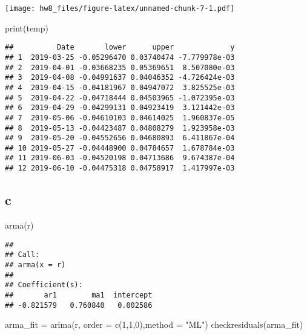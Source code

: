\documentclass[
]{article}
\newenvironment{Shaded}{\begin{snugshade}}{\end{snugshade}}
\newcommand{\AttributeTok}[1]{\textcolor[rgb]{0.77,0.63,0.00}{#1}}
\newcommand{\DecValTok}[1]{\textcolor[rgb]{0.00,0.00,0.81}{#1}}
\newcommand{\FunctionTok}[1]{\textcolor[rgb]{0.00,0.00,0.00}{#1}}
\newcommand{\NormalTok}[1]{#1}
\newcommand{\OtherTok}[1]{\textcolor[rgb]{0.56,0.35,0.01}{#1}}
\newcommand{\StringTok}[1]{\textcolor[rgb]{0.31,0.60,0.02}{#1}}
\begin{document}
\texttt{[image: hw8\_files/figure-latex/unnamed-chunk-7-1.pdf]}

\begin{Shaded}
\begin{Highlighting}[]
\FunctionTok{print}\NormalTok{(temp)}
\end{Highlighting}
\end{Shaded}

\begin{verbatim}
##          Date       lower      upper             y
## 1  2019-03-25 -0.05296470 0.03740474 -7.779978e-03
## 2  2019-04-01 -0.03668235 0.05369651  8.507080e-03
## 3  2019-04-08 -0.04991637 0.04046352 -4.726424e-03
## 4  2019-04-15 -0.04181967 0.04947072  3.825525e-03
## 5  2019-04-22 -0.04718444 0.04503965 -1.072395e-03
## 6  2019-04-29 -0.04299131 0.04923419  3.121442e-03
## 7  2019-05-06 -0.04610103 0.04614025  1.960837e-05
## 8  2019-05-13 -0.04423487 0.04808279  1.923958e-03
## 9  2019-05-20 -0.04552656 0.04680893  6.411867e-04
## 10 2019-05-27 -0.04448900 0.04784657  1.678784e-03
## 11 2019-06-03 -0.04520198 0.04713686  9.674387e-04
## 12 2019-06-10 -0.04475318 0.04758917  1.417997e-03
\end{verbatim}

\hypertarget{c-2}{%
\subsection{c}\label{c-2}}

\begin{Shaded}
\begin{Highlighting}[]
\FunctionTok{arma}\NormalTok{(r)}
\end{Highlighting}
\end{Shaded}

\begin{verbatim}
## 
## Call:
## arma(x = r)
## 
## Coefficient(s):
##       ar1        ma1  intercept  
## -0.821579   0.760840   0.002586
\end{verbatim}

\begin{Shaded}
\begin{Highlighting}[]
\NormalTok{arma\_fit }\OtherTok{=} \FunctionTok{arima}\NormalTok{(r, }\AttributeTok{order =} \FunctionTok{c}\NormalTok{(}\DecValTok{1}\NormalTok{,}\DecValTok{1}\NormalTok{,}\DecValTok{0}\NormalTok{),}\AttributeTok{method =} \StringTok{"ML"}\NormalTok{)}
\FunctionTok{checkresiduals}\NormalTok{(arma\_fit)}
\end{Highlighting}
\end{Shaded}
\end{document}
